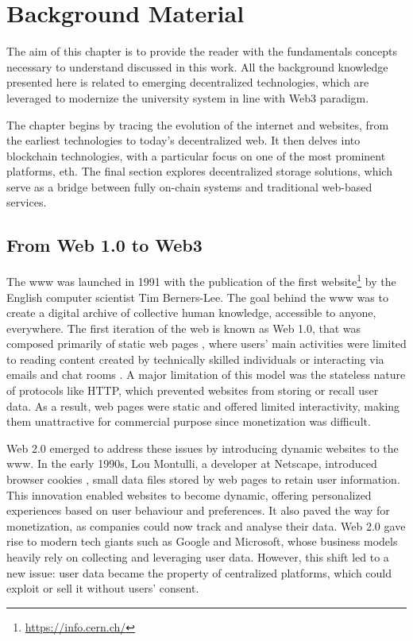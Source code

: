 \chapter{Background Material}
The aim of this chapter is to provide the reader with the fundamentals concepts necessary to understand discussed in this work. All the background knowledge presented here is related to emerging decentralized technologies, which are leveraged to modernize the university system in line with Web3 paradigm.

The chapter begins by tracing the evolution of the internet and websites, from the earliest technologies to today's decentralized web. It then delves into blockchain technologies, with a particular focus on one of the most prominent platforms, \acrlong{eth}. The final section explores decentralized storage solutions, which serve as a bridge between fully on-chain systems and traditional web-based services.

\section{From Web 1.0 to Web3}
The \acrfull{www} \cite{berners1992world} was launched in 1991 with the publication of the first website\footnote{\url{https://info.cern.ch/}} by the English computer scientist Tim Berners-Lee. The goal behind the \acrshort{www} was to create a digital archive of collective human knowledge, accessible to anyone, everywhere. The first iteration of the web is known as Web 1.0, that was composed primarily of static web pages \cite{choudhury2014world}, where users' main activities were limited to reading content created by technically skilled individuals or interacting via emails and chat rooms \cite{murray2023promise}. A major limitation of this model was the stateless nature of protocols like HTTP, which prevented websites from storing or recall user data. As a result, web pages were static and offered limited interactivity, making them unattractive for commercial purpose since monetization was difficult.

Web 2.0 emerged to address these issues by introducing dynamic websites to the \acrshort{www}. In the early 1990s, Lou Montulli, a developer at Netscape, introduced browser cookies \cite{kristol1997rfc2109}, small data files stored by web pages to retain user information. This innovation enabled websites to become dynamic, offering personalized experiences based on user behaviour and preferences. It also paved the way for monetization, as companies could now track and analyse their data. Web 2.0 gave rise to modern tech giants such as Google and Microsoft, whose business models heavily rely on collecting and leveraging user data. However, this shift led to a new issue: user data became the property of centralized platforms, which could exploit or sell it without users' consent.

